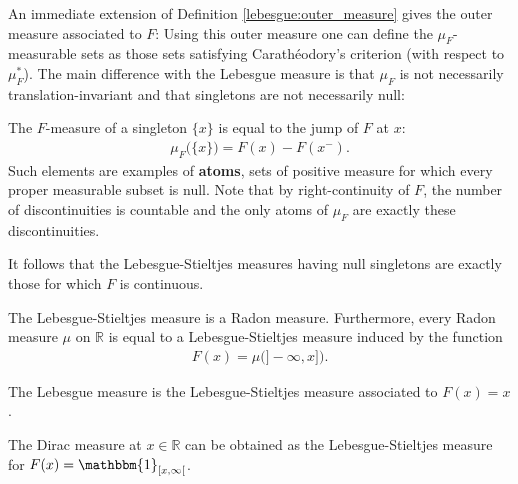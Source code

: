     An immediate extension of Definition \ref{lebesgue:outer_measure} gives the outer measure associated to $F$:
    Using this outer measure one can define the $\mu_F$-measurable sets as those sets satisfying Carath\'eodory's criterion (with respect to $\mu_F^*$). The main difference with the Lebesgue measure is that $\mu_F$ is not necessarily translation-invariant and that singletons are not necessarily null:
    \begin{property}[Singletons]
        The $F$-measure of a singleton $\{x\}$ is equal to the jump of $F$ at $x$:
        \begin{gather}
            \mu_F\big(\{x\}\big) = F(x) - F(x^-).
        \end{gather}
        Such elements are examples of \textbf{atoms}, sets of positive measure for which every proper measurable subset is null. Note that by right-continuity of $F$, the number of discontinuities is countable and the only atoms of $\mu_F$ are exactly these discontinuities.
    \end{property}
    \begin{result}
        It follows that the Lebesgue-Stieltjes measures having null singletons are exactly those for which $F$ is continuous.
    \end{result}

    \begin{property}[Regularity]
        The Lebesgue-Stieltjes measure is a Radon measure. Furthermore, every Radon measure $\mu$ on $\mathbb{R}$ is equal to a Lebesgue-Stieltjes measure induced by the function
        \begin{gather}
            F(x) = \mu\big(]-\!\infty,x]\big).
        \end{gather}
    \end{property}

    \begin{example}
        The Lebesgue measure is the Lebesgue-Stieltjes measure associated to $F(x)=x$.
    \end{example}
    \begin{example}
        The Dirac measure at $x\in\mathbb{R}$ can be obtained as the Lebesgue-Stieltjes measure for $F(x)=\mathbbm{1}_{[x,\infty[}$.
    \end{example}

